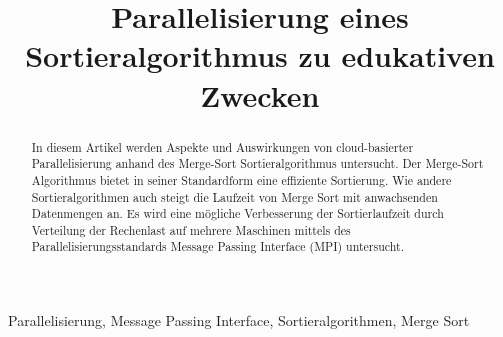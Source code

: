 \documentclass[conference]{IEEEtran}
\begin{document}
\title{Parallelisierung eines Sortieralgorithmus zu edukativen Zwecken\\
}

\author{
\and
{}
\and
{}
\and
{}
}

\maketitle

\begin{abstract}
In diesem Artikel werden Aspekte und Auswirkungen von cloud-basierter Parallelisierung anhand des Merge-Sort Sortieralgorithmus untersucht. Der Merge-Sort Algorithmus bietet in seiner Standardform eine effiziente Sortierung. Wie andere Sortieralgorithmen auch steigt die Laufzeit von Merge Sort mit anwachsenden Datenmengen an. Es wird eine mögliche Verbesserung der Sortierlaufzeit durch Verteilung der Rechenlast auf mehrere Maschinen mittels des Parallelisierungsstandards Message Passing Interface (MPI) untersucht.
\end{abstract}

\begin{IEEEkeywords}
	Parallelisierung, Message Passing Interface, Sortieralgorithmen, Merge Sort
\end{IEEEkeywords}
\end{document}
